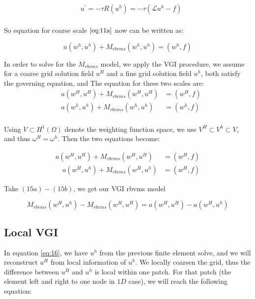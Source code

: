 \documentclass[10pt]{article}
\begin{document}
\begin{equation}
    \begin{aligned}
       \quad u^{\prime} = -\tau R(u^{h}) = -\tau (\mathcal{L} u^{h} - f)\\\label{eq:12}
    \end{aligned}
\end{equation}

So equation for coarse scale $\eqref{eq:11a}$ now can be written as:

\begin{equation}
a(w^{h},u^{h}) + M_{rbvms}(w^{h},u^{h})  = (w^{h},f)\label{eq:13}
\end{equation}

In order to solve for the $M_{rbvms}$ model, we apply the VGI procedure, we assume for a coarse grid solution field $u^{H}$ and a fine grid solution field $u^{h}$, both satisfy the governing equation, and The equation for these two scales are:  
\begin{equation}
    \begin{aligned}
       \quad a(w^{H},u^{H}) + M_{rbvms}(w^{H},u^{H})  &= (w^{H},f) \\
        \quad a(w^{h},u^{h}) + M_{rbvms}(w^{h},u^{h})  &= (w^{h},f) \\
    \end{aligned}\label{eq:14}
\end{equation}

Using $V \subset H^{1}(\Omega)$ denote the weighting function space, we use $V^{H} \subset V^{h} \subset V $, and thus $\omega^{H} = \omega^{h}$. Then the two equations become:

\begin{subequations}\label{eq:15}
\begin{align} 
 a(w^{H},u^{H}) + M_{rbvms}(w^{H},u^{H})  &= (w^{H},f) \label{eq:15a} \\
 \quad a(w^{H},u^{h}) + M_{rbvms}(w^{H},u^{h})  &= (w^{H},f)\label{eq:15b} 
\end{align}
\end{subequations}

Take $(15a)-(15b)$, we get our VGI rbvms model

\begin{equation}
M_{rbvms}(w^{H},u^{h}) - M_{rbvms}(w^{H},u^{H})  = a(w^{H},u^{H})-a(w^{H},u^{h})\label{eq:16} 
\end{equation}

\subsection{Local VGI}
In equation \ref{eq:16}, we have $u^h$ from the previous finite element solve, and we will reconstruct $u^H$ from local information of $u^h$. We locally coarsen the grid, thus the difference between $u^{H}$ and $u^{h}$ is local within one patch. For that patch (the element left and right to one node in $1D$ case), we will reach the following equation:
\end{document}
